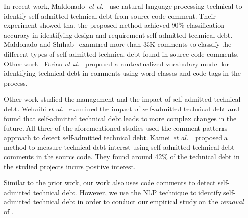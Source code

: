 In recent work, Maldonado~\textit{et al.}~\cite{Maldonado2015TSE} use natural language processing technical to identify self-admitted technical debt from source code comment. Their experiment showed that the proposed method achieved 90\% classification accuracy in identifying design and requirement self-admitted technical debt.  Maldonado and Shihab~\cite{Maldonado2015MTD} examined more than 33K comments to classify the different types of self-admitted technical debt found in source code comments. Other work~ Farias \textit{et al.}~\cite{Farias2015MTD} proposed a contextualized vocabulary model for identifying technical debt in comments using word classes and code tags in the process.



Other work studied the management and the impact of self-admitted technical debt. Wehaibi \textit{et al.}~\cite{Wehaibi2016SANER} examined the impact of self-admitted technical debt and found that self-admitted technical debt leads to more complex changes in the future. All three of the aforementioned studies used the comment patterns approach to detect self-admitted technical debt. Kamei~\textit{et al.}~\cite{kameiusingTDA2016}~proposed a method to measure technical debt interest using self-admitted technical debt comments in the source code. They found around 42\% of the technical debt in the studied projects incurs positive interest.

 
Similar to the prior work, our work also uses code comments to detect self-admitted technical debt. However, we use the NLP technique to identify self-admitted technical debt in order to conduct our empirical study on the \emph{removal} of \SATD.










